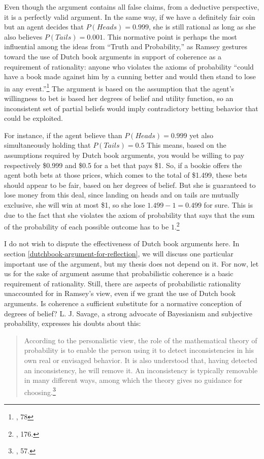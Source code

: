 Even though the argument contains all false claims, from a deductive
perspective, it is a perfectly valid argument. In the same way, if we
have a definitely fair coin but an agent decides that
\(P(Heads)=0.999\), she is still rational as long as she also believes
\(P(Tails) = 0.001\). This normative point is perhaps the most
influential among the ideas from ``Truth and Probability,'' as Ramsey
gestures toward the use of Dutch book arguments in support of coherence
as a requirement of rationality: anyone who violates the axioms of
probability ``could have a book made against him by a cunning better and
would then stand to lose in any event.''\footnote{\cite{ramsey}, 78} The argument
is based on the assumption that the agent's willingness to bet is based
her degrees of belief and utility function, so an inconsistent set of
partial beliefs would imply contradictory betting behavior that could be
exploited.

For instance, if the agent believe than \(P(Heads) = 0.999\) yet also
simultaneously holding that \(P(Tails) = 0.5\) This means, based on the
assumptions required by Dutch book arguments, you would be willing to
pay respectively \$0.999 and \$0.5 for a bet that pays \$1. So, if a
bookie offers the agent both bets at those prices, which comes to the
total of \$1.499, these bets should appear to be fair, based on her
degrees of belief. But she is guaranteed to lose money from this deal,
since landing on heads and on tails are mutually exclusive, she will win
at most \$1, so she lose \(1.499 - 1 = 0.499\) for sure. This is due to
the fact that she violates the axiom of probability that says that the
sum of the probability of each possible outcome has to be
\(1\).\footnote{\cite{hajekdutchbook}, 176.}

I do not wish to dispute the effectiveness of Dutch book arguments here. In section \ref{dutchbook-argument-for-reflection}, we will discuss one particular important use of the argument, but my thesis does not depend on it.
For now, let us for the sake of argument assume that probabilistic coherence is a
basic requirement of rationality. Still, there are aspects of probabilistic rationality  unaccounted for in Ramsey's view, even
if we grant the use of Dutch book arguments. Is coherence a
sufficient substitute for a normative conception of degrees of belief?
L. J. Savage, a strong advocate of Bayesianism and subjective
probability, expresses his doubts about this:

\begin{quote}
According to the personalistic view, the role of the mathematical theory
of probability is to enable the person using it to detect
inconsistencies in his own real or envisaged behavior. It is also
understood that, having detected an inconsistency, he will remove it. An
inconsistency is typically removable in many different ways, among which
the theory gives no guidance for choosing.\footnote{\cite{savage}, 57.}
\end{quote}


